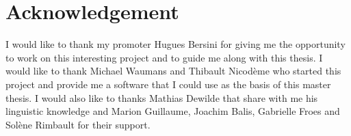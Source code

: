 \documentclass[a4paper, 12pt]{report}
\begin{document}
%
%
%






\section*{Acknowledgement}
I would like to thank my promoter Hugues Bersini for giving me the opportunity to work on this interesting project and to guide me along with this thesis. I would like to thank Michael Waumans and Thibault Nicodème who started this project and provide me a software that I could use as the basis of this master thesis. I would also like to thanks Mathias Dewilde that share with me his linguistic knowledge and Marion Guillaume, Joachim Balis, Gabrielle Froes and Solène Rimbault for their support.
\tableofcontents
\end{document}
